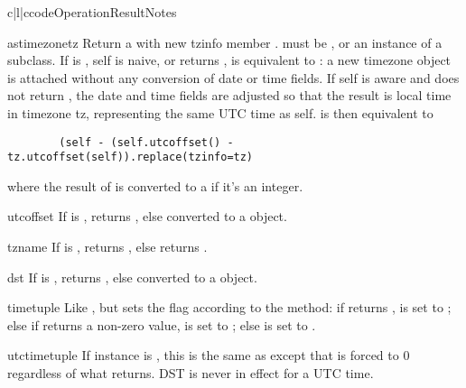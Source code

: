 \begin{tableiii}{c|l|c}{code}{Operation}{Result}{Notes}
\begin{methoddesc}{astimezone}{tz}
    Return a  with new tzinfo member .  
    must be , or an instance of a  subclass.  If
     is , self is naive, or
     returns ,
     is equivalent to
    :  a new timezone object is attached
    without any conversion of date or time fields.  If self is aware and
     does not return , the date and
    time fields are adjusted so that the result is local time in timezone
    tz, representing the same UTC time as self.  
    is then equivalent to
    \begin{verbatim}
        (self - (self.utcoffset() - tz.utcoffset(self)).replace(tzinfo=tz)
    \end{verbatim}
    where the result of  is converted to a
     if it's an integer.
\end{methoddesc}

\begin{methoddesc}{utcoffset}{}
    If  is , returns , else
     converted to a 
    object.
\end{methoddesc}

\begin{methoddesc}{tzname}{}
    If  is , returns , else
    returns .
\end{methoddesc}

\begin{methoddesc}{dst}{}
    If  is , returns , else
     converted to a 
    object.
\end{methoddesc}

\begin{methoddesc}{timetuple}{}
    Like , but sets the
     flag according to the  method:  if
     returns ,  is set to
    ; else if  returns a non-zero value,
     is set to ; else  is set
    to .
\end{methoddesc}

\begin{methoddesc}{utctimetuple}{}
    If  instance  is \naive, this is the same as
     except that  is forced to 0
    regardless of what  returns.  DST is never in effect
    for a UTC time.


\end{methoddesc}
\end{tableiii}
